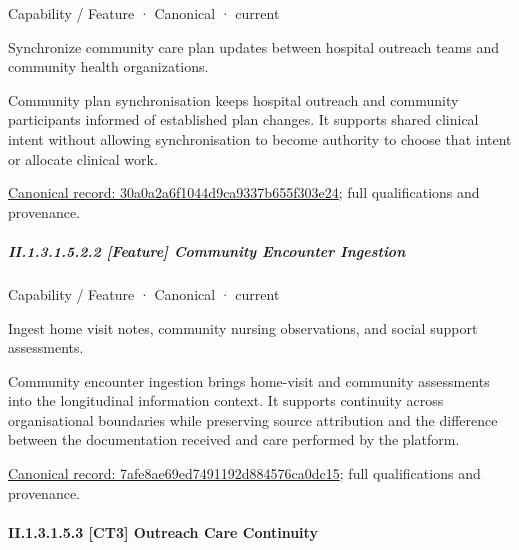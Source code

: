 \label{element:30a0a2a6f1044d9ca9337b655f303e24}
{\small Capability / Feature · Canonical · current}\par

Synchronize community care plan updates between hospital outreach teams and community health organizations.



Community plan synchronisation keeps hospital outreach and community participants informed of established plan changes. It supports shared clinical intent without allowing synchronisation to become authority to choose that intent or allocate clinical work.


{\footnotesize \href{../../../../continuum/strategy/capability/feature/30a0a2a6f1044d9ca9337b655f303e24.md}{Canonical record: 30a0a2a6f1044d9ca9337b655f303e24}; full qualifications and provenance.}\par
\subparagraph*{II.1.3.1.5.2.2 [Feature] Community Encounter Ingestion}
\label{navigation:II.1.3.1.5.2.2}

\label{element:7afe8ae69ed7491192d884576ca0dc15}
{\small Capability / Feature · Canonical · current}\par

Ingest home visit notes, community nursing observations, and social support assessments.



Community encounter ingestion brings home-visit and community assessments into the longitudinal information context. It supports continuity across organisational boundaries while preserving source attribution and the difference between the documentation received and care performed by the platform.


{\footnotesize \href{../../../../continuum/strategy/capability/feature/7afe8ae69ed7491192d884576ca0dc15.md}{Canonical record: 7afe8ae69ed7491192d884576ca0dc15}; full qualifications and provenance.}\par
\paragraph*{II.1.3.1.5.3 [CT3] Outreach Care Continuity}
\label{navigation:II.1.3.1.5.3}

